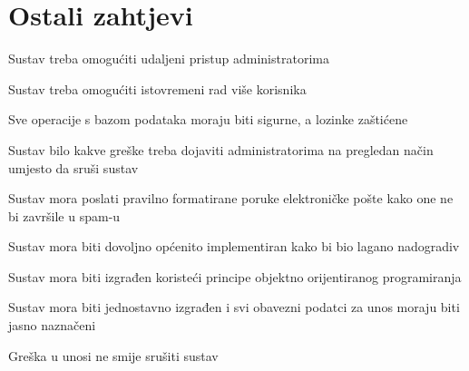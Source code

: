 				
	
		\section{Ostali zahtjevi}
		
		\begin{packed_item}
			\item Sustav treba omogućiti udaljeni pristup administratorima
			\item Sustav treba omogućiti istovremeni rad više korisnika
			\item Sve operacije s bazom podataka moraju biti sigurne, a lozinke zaštićene
			\item Sustav bilo kakve greške treba dojaviti administratorima na pregledan način umjesto da sruši sustav
			\item Sustav mora poslati pravilno formatirane poruke elektroničke pošte kako one ne bi završile u spam-u
			\item Sustav mora biti dovoljno općenito implementiran kako bi bio lagano nadogradiv
			\item Sustav mora biti izgrađen koristeći principe objektno orijentiranog programiranja
			\item Sustav mora biti jednostavno izgrađen i svi obavezni podatci za unos moraju biti jasno naznačeni
			\item Greška u unosi ne smije srušiti sustav
		\end{packed_item}
			 
			 
			 
	